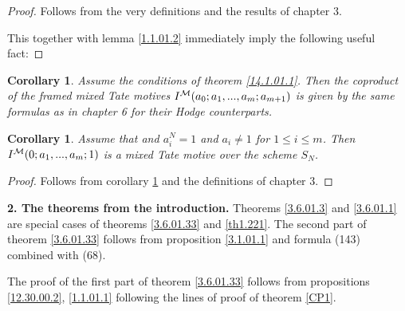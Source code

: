 \documentclass[10pt]{article}
\newtheorem{corollary}[theorem]{Corollary}
\begin{document}
\begin{proof} Follows from the very definitions and the results of chapter 3. 

This together with  lemma \ref{1.1.01.2} immediately imply the following useful fact:


\end{proof}

\begin{corollary} \label{3.12.01.1}
Assume the conditions of theorem \ref{14.1.01.1}. Then the coproduct of the 
framed mixed Tate motives $I^{\cal M}(a_0; a_1, ..., a_m; a_{m+1})$ 
is given  by the same formulas as in chapter 6 for their Hodge counterparts. 
\end{corollary}

\begin{corollary} \label{3.12.01.2} Assume that  and $a_i^N=1$ and $a_i \not = 1$ for $1 \leq i \leq m$. 
Then 
$I^{\cal M}(0; a_1, ..., a_m; 1)$ is a mixed Tate motive over the scheme $S_N$. 
\end{corollary}

\begin{proof} Follows from corollary \ref{3.12.01.1} 
and the definitions of chapter 3. 



\end{proof}

{\bf 2. The theorems from the introduction.} Theorems \ref{3.6.01.3} and \ref{3.6.01.1} 
are special 
cases of theorems \ref{3.6.01.33} and \ref{th1.221}. The second part of theorem 
\ref{3.6.01.33} follows 
from proposition \ref{3.1.01.1} and formula (143) combined with (68). 

The proof of the first part of theorem \ref{3.6.01.33} follows from propositions 
\ref{12.30.00.2},  \ref{1.1.01.1}
following  the lines  of proof of theorem \ref{CP1}. 
\end{document}
